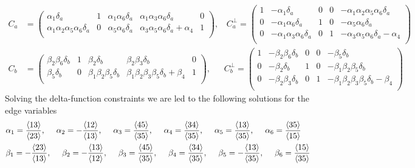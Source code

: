 \documentclass[letter,11pt]{article}
\begin{document}
\begin{equation}
	\begin{aligned}
		C_a&=\left(
		\begin{array}{ccccc}
			\alpha _1 \delta_a & 1 & \alpha _1 \alpha _6 \delta_a & \alpha _1 \alpha _3 \alpha _6 \delta_a & 0 \\
	\alpha _1 \alpha _2 \alpha _5 \alpha _6 \delta_a & 0 & \alpha _5 \alpha _6 \delta_a & \alpha _3 \alpha _5 \alpha _6 \delta_a+\alpha _4 & 1 \\
		\end{array}
		\right)
		,~~~~
		C_a^\perp = \left(
		\begin{array}{ccccc}
			1 & -\alpha _1 \delta_a & 0 & 0 & -\alpha _1 \alpha _2 \alpha _5 \alpha _6 \delta_a \\
		0 & -\alpha _1 \alpha _6 \delta_a & 1 & 0 & -\alpha _5 \alpha _6 \delta_a \\
		0 & -\alpha _1 \alpha _3 \alpha _6 \delta_a & 0 & 1 & -\alpha _3 \alpha _5 \alpha _6 \delta_a-\alpha _4 \\
		\end{array}
		\right)\\
		C_b&=\left(
		\begin{array}{ccccc}
			\beta _2 \beta _6 \delta_b & 1 & \beta _2 \delta_b & \beta _2 \beta _3 \delta_b & 0 \\
			\beta _5 \delta_b & 0 & \beta _1 \beta _2 \beta _5 \delta_b & \beta _1 \beta _2 \beta _3 \beta _5 \delta_b+\beta _4 & 1 \\
		\end{array}
		\right),~~~~~~~C_b^\perp =
		\left(
		\begin{array}{ccccc}
			1 & -\beta _2 \beta _6 \delta_b & 0 & 0 & -\beta _5 \delta_b \\
			0 & -\beta _2 \delta_b & 1 & 0 & -\beta _1 \beta _2 \beta _5 \delta_b \\
			0 & -\beta _2 \beta _3 \delta_b & 0 & 1 & -\beta _1 \beta _2 \beta _3 \beta _5 \delta_b -\beta _4 \\
		\end{array}
		\right)
	\end{aligned}
\end{equation}
Solving the delta-function constraints we are led to the following solutions for the edge variables
\begin{equation}
	\begin{aligned}
		&\alpha_1=\frac{\expval{13}}{\expval{23}},~~~~
		\alpha_2=-\frac{\expval{12}}{\expval{13}},~~~~
		\alpha_3=\frac{\expval{45}}{\expval{35}},~~~~
		\alpha_4=\frac{\expval{34}}{\expval{35}},~~~~
		\alpha_5=\frac{\expval{13}}{\expval{35}},~~~~
		\alpha_6=\frac{\expval{35}}{\expval{15}}\\
	&\beta_1=-\frac{\expval{23}}{\expval{13}},~~~~
	\beta_2=-\frac{\expval{13}}{\expval{12}},~~~~
	\beta_3=\frac{\expval{45}}{\expval{35}},~~~~
	\beta_4=\frac{\expval{34}}{\expval{35}},~~~~
	\beta_5=-\frac{\expval{13}}{\expval{35}},~~~~
	\beta_6=\frac{\expval{15}}{\expval{35}}
	\end{aligned}
\end{equation}
\end{document}
